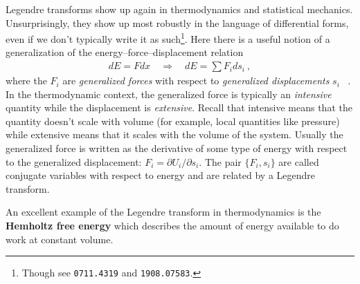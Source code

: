 Legendre transforms show up again in thermodynamics and statistical mechanics. Unsurprisingly, they show up most robustly in the language of differential forms, even if we don't typically write it as such\footnote{Though see \texttt{0711.4319} and \texttt{1908.07583}.}. Here there is a useful notion of a generalization of the energy--force--displacement relation
\begin{align}
	dE = F dx \quad\Rightarrow \quad dE = \sum F_i ds_i \ ,
\end{align}
where the $F_i$ are \emph{generalized forces} with respect to \emph{generalized displacements} $s_i$ \ . In the thermodynamic context, the generalized force is typically an \emph{intensive} quantity while the displacement is \emph{extensive}. Recall that intensive means that the quantity doesn't scale with volume (for example, local quantities like pressure) while extensive means that it scales with the volume of the system. Usually the generalized force is written as the derivative of some type of energy with respect to the generalized displacement: $F_i = \partial U_i / \partial s_i$.  The pair $\{F_i, s_i\}$ are called conjugate variables with respect to energy and are related by a Legendre transform. 

An excellent example of the Legendre transform in thermodynamics is the \textbf{Hemholtz free energy} which describes the amount of energy available to do work at constant volume. 








